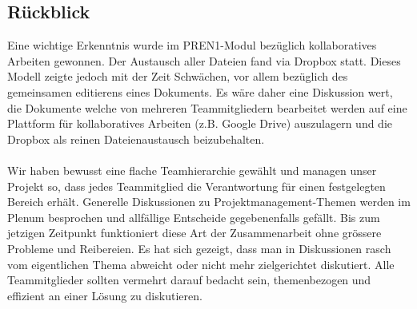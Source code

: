\subsection{Rückblick}
Eine wichtige Erkenntnis wurde im PREN1-Modul bezüglich kollaboratives Arbeiten 
gewonnen. Der Austausch aller Dateien fand via Dropbox statt. Dieses Modell zeigte 
jedoch mit der Zeit Schwächen, vor allem bezüglich des gemeinsamen editierens eines 
Dokuments. Es wäre daher eine Diskussion wert, die Dokumente welche von mehreren 
Teammitgliedern bearbeitet werden auf eine Plattform für kollaboratives Arbeiten 
(z.B. Google Drive) auszulagern und die Dropbox als reinen Dateienaustausch 
beizubehalten.\\
\\
Wir haben bewusst eine flache Teamhierarchie gewählt und managen unser Projekt 
so, dass jedes Teammitglied die Verantwortung für einen festgelegten Bereich 
erhält. Generelle Diskussionen zu Projektmanagement-Themen werden im Plenum 
besprochen und allfällige Entscheide gegebenenfalls gefällt. Bis zum jetzigen 
Zeitpunkt funktioniert diese Art der Zusammenarbeit ohne grössere Probleme und 
Reibereien. Es hat sich gezeigt, dass man in Diskussionen rasch vom eigentlichen 
Thema abweicht oder nicht mehr zielgerichtet diskutiert. Alle Teammitglieder 
sollten vermehrt darauf bedacht sein, themenbezogen und effizient an einer Lösung 
zu diskutieren.
